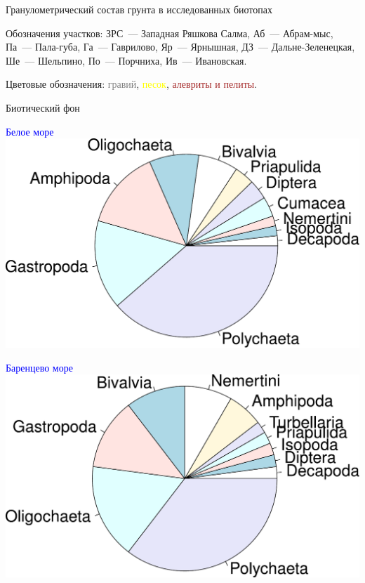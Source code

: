 \documentclass{beamer}
\begin{document}
\begin{frame}{Гранулометрический состав грунта в исследованных биотопах}
\begin{tiny} 
Обозначения участков: ЗРС~--- Западная Ряшкова Салма, Аб~--- Абрам-мыс, Па~--- Пала-губа, Га~--- Гаврилово, Яр~--- Ярнышная, ДЗ~--- Дальне-Зеленецкая, Ше~--- Шельпино, По~--- Порчниха, Ив~--- Ивановская.\\
\end{tiny}
{\scriptsize Цветовые обозначения: \textcolor{gray}{гравий}, \textcolor{yellow}{песок}, \textcolor{brown}{алевриты и пелиты}.}

\end{frame}

\begin{frame}{Биотический фон}
		\begin{flushleft}
		\textcolor{blue}{\footnotesize Белое море}\\
			\includegraphics[height=0.35\textheight]{White_taxons_pie_big1.pdf}
		\end{flushleft}

		\begin{flushright}
		\textcolor{blue}{\footnotesize Баренцево море}\\
			\includegraphics[height=0.35\textheight]{Barents_taxons_pie_big1.pdf}
		\end{flushright}
\end{frame}
\end{document}
